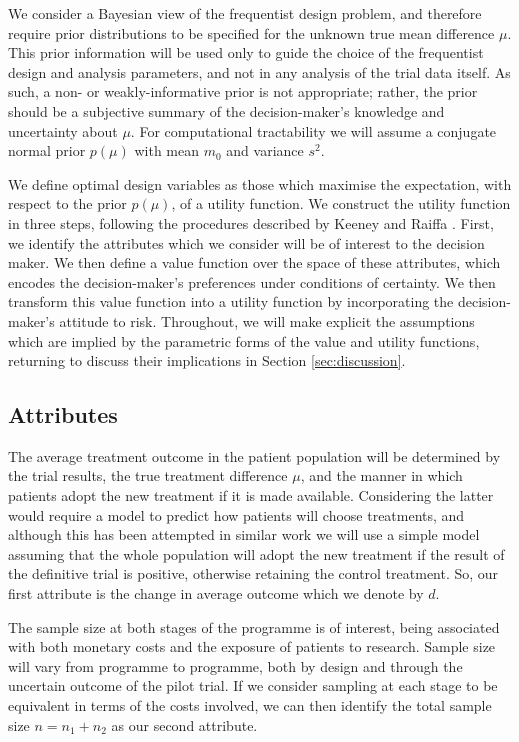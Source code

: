 \documentclass[sagev, Crown]{sagej}
\begin{document}
We consider a Bayesian view of the frequentist design problem, and therefore require prior distributions to be specified for the unknown true mean difference $\mu$. This prior information will be used only to guide the choice of the frequentist design and analysis parameters, and not in any analysis of the trial data itself. As such, a non- or weakly-informative prior is not appropriate; rather, the prior should be a subjective summary of the decision-maker's knowledge and uncertainty about $\mu$. For computational tractability we will assume a conjugate normal prior $p(\mu)$ with mean $m_0$ and variance $s^2$.

We define optimal design variables as those which maximise the expectation, with respect to the prior $p(\mu)$, of a utility function. We construct the utility function in three steps, following the procedures described by Keeney and Raiffa \cite{Keeney1976}. First, we identify the attributes which we consider will be of interest to the decision maker. We then define a value function over the space of these attributes, which encodes the decision-maker's preferences under conditions of certainty. We then transform this value function into a utility function by incorporating the decision-maker's attitude to risk. Throughout, we will make explicit the assumptions which are implied by the parametric forms of the value and utility functions, returning to discuss their implications in Section \ref{sec:discussion}.

\subsection{Attributes}

The average treatment outcome in the patient population will be determined by the trial results, the true treatment difference $\mu$, and the manner in which patients adopt the new treatment if it is made available. Considering the latter would require a model to predict how patients will choose treatments, and although this has been attempted in similar work \cite{Gittins2000a, Kikuchi2009} we will use a simple model assuming that the whole population will adopt the new treatment if the result of the definitive trial is positive, otherwise retaining the control treatment. So, our first attribute is the change in average outcome which we denote by $d$.

The sample size at both stages of the programme is of interest, being associated with both monetary costs and the exposure of patients to research. Sample size will vary from programme to programme, both by design and through the uncertain outcome of the pilot trial. If we consider sampling at each stage to be equivalent in terms of the costs involved, we can then identify the total sample size $n = n_1 + n_2$ as our second attribute. 
\end{document}
